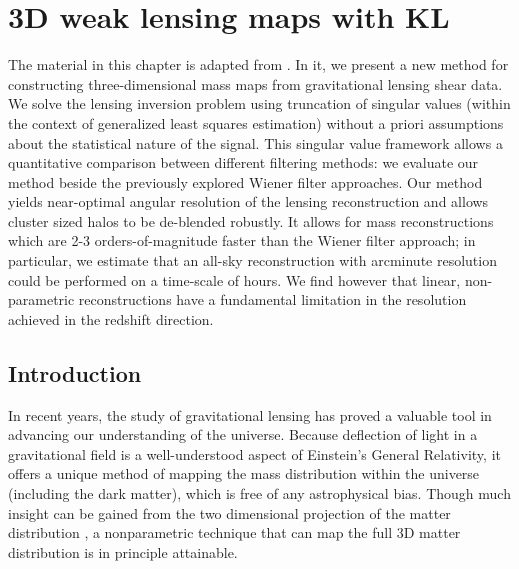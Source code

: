 \chapter{3D weak lensing maps with KL}

The material in this chapter is adapted from \citet{Vanderplas2011}.
In it, we present a new method for constructing three-dimensional
mass maps from gravitational lensing shear data.  We solve the lensing
inversion problem using truncation of singular values
(within the context of generalized
least squares estimation) without a priori assumptions about the
statistical nature of the signal.   This singular value framework 
allows a quantitative
comparison between different filtering methods: we evaluate our method
beside the previously explored Wiener filter approaches.
Our method yields near-optimal angular resolution of the lensing
reconstruction and allows cluster sized halos to be de-blended robustly.
It allows for mass reconstructions which are
2-3 orders-of-magnitude faster than the Wiener
filter approach; in particular, we estimate that an all-sky
reconstruction with arcminute resolution could be performed
on a time-scale of hours. We find however that linear, 
non-parametric reconstructions have a fundamental limitation in the
resolution achieved in the redshift direction.

\section{Introduction}

In recent years, the study of gravitational lensing has proved a
valuable tool in advancing our understanding of the universe.  Because
deflection of light in a gravitational field is a well-understood
aspect of Einstein's General Relativity, it offers a unique method of
mapping the mass distribution within the universe (including the dark
matter), which is free of any astrophysical bias.  Though much insight
can be gained from the two dimensional projection of the matter distribution
\citep[see, e.g.][]{Clowe06}, a nonparametric technique that can map
the full 3D matter distribution is in principle attainable. 

